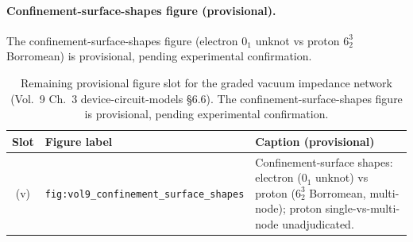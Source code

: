 \paragraph{Confinement-surface-shapes figure (provisional).}
The confinement-surface-shapes figure (electron $0_1$ unknot vs proton $6^3_2$ Borromean) is provisional, pending experimental confirmation.

\begin{table}[htbp]
\centering\footnotesize
\begin{tabular}{@{}c l p{8.2cm}@{}}
\toprule
\textbf{Slot} & \textbf{Figure label} & \textbf{Caption (provisional)} \\
\midrule
(v) & \texttt{fig:vol9\_confinement\_surface\_shapes} & Confinement-surface shapes: electron ($0_1$ unknot) vs proton ($6^3_2$ Borromean, multi-node); proton single-vs-multi-node unadjudicated. \\
\bottomrule
\end{tabular}
\caption{Remaining provisional figure slot for the graded vacuum impedance network (Vol.~9 Ch.~3 device-circuit-models \S6.6). The confinement-surface-shapes figure is provisional, pending experimental confirmation.}
\label{tab:vol9_graded_network_figure_slots}
\end{table}

